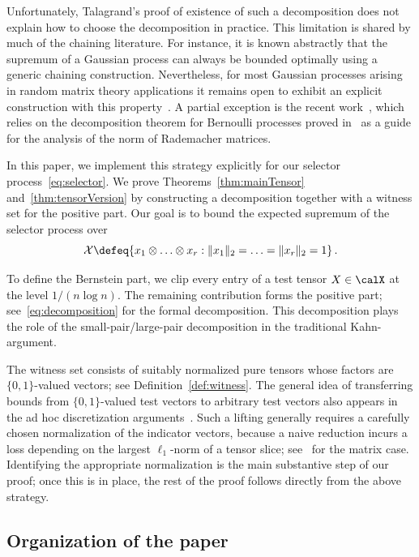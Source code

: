 \documentclass[11pt,a4paper]{article}
\begin{document}
Unfortunately, Talagrand's proof
of existence of such a decomposition does not explain how
to choose the decomposition in practice. This limitation is shared by much
of the chaining literature. For instance, it is known
abstractly that the supremum of a Gaussian process can always be bounded
optimally using a generic chaining construction.
Nevertheless, for most Gaussian
processes arising in random matrix theory applications it remains open to exhibit an explicit construction with this property~\cite{talagrandChaining,vanHandelChaining,leeChaining}. A partial exception is the recent
work~\cite{latalaRademacher}, which relies on the decomposition theorem for Bernoulli processes proved in~\cite{bernoulliConjecture} as a guide
for the analysis of the norm of Rademacher matrices.

In this paper, we implement this strategy explicitly for our selector process~\eqref{eq:selector}. We prove Theorems~\ref{thm:mainTensor} and~\ref{thm:tensorVersion}
by constructing a decomposition together with
a witness set for the positive part.
Our goal is to bound the expected supremum of the selector process over
\begin{equation}
    \mathcal X \defeq \{x_1\otimes \ldots \otimes x_r : \|x_1\|_2= \ldots= \|x_r\|_2 = 1\}\,.\label{eq:pureTensors}
\end{equation}

To define the Bernstein part, we clip every entry
of a test tensor $X\in \calX$
at the level $1/(n \log n)$. The remaining
contribution forms the positive part; see~\eqref{eq:decomposition} for the formal decomposition. This decomposition plays the role of the small-pair/large-pair
decomposition in the traditional Kahn-\Szemeredi argument.

The witness set consists of suitably normalized pure tensors whose factors are $\{0,1\}$-valued vectors; see Definition~\ref{def:witness}. 
The general idea of transferring bounds from $\{0,1\}$-valued
test vectors to arbitrary test vectors
also appears in the ad hoc discretization
arguments~\cite{kahnSzemeredi,feigeOfek}.
Such a lifting generally requires a carefully
chosen normalization of the indicator
vectors, because a naive reduction incurs
a loss depending on the largest $\ell_1$-norm
of a tensor slice; see~\cite[Section 4.2]{biluLinial} for the matrix case.
Identifying the appropriate normalization
is the main substantive step of our proof;
once this is in place, the rest of the proof
follows directly from the above strategy.

\subsection{Organization of the paper}
\end{document}
